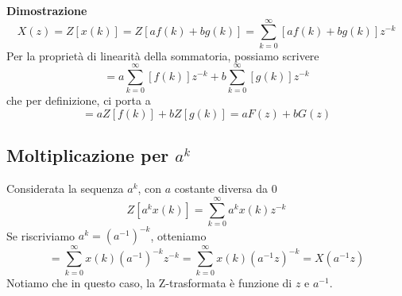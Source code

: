 \documentclass[a4paper]{report}
\newcommand{\bo}{\bfseries }
\begin{document}
  {\bo Dimostrazione}
  \[
  X(z) = Z[x(k)] = Z[af(k) + bg(k)] = \sum_{k=0}^{\infty} [af(k) + bg(k)]z^{-k}
  \]
  Per la propriet\`a di linearit\`a della sommatoria, possiamo
  scrivere
  \[
  = a\sum_{k=0}^{\infty} [f(k)]z^{-k} + b\sum_{k=0}^{\infty} [g(k)]z^{-k}
  \]
  che per definizione, ci porta a
  \[
  = aZ[f(k)] + bZ[g(k)] = aF(z) + bG(z)
  \]
\subsection{Moltiplicazione per $a^k$}
Considerata la sequenza $a^k$, con $a$ costante diversa da $0$
\[
Z[a^k x(k)] = \sum\limits_{k = 0}^{\infty} a^k x(k) z^{-k}
\]
Se riscriviamo $a^k = (a^{-1})^{-k}$, otteniamo
\[
= \sum\limits_{k=0}^{\infty} x(k)(a^{-1})^{-k}z^{-k}
= \sum\limits_{k=0}^{\infty} x(k)(a^{-1}z)^{-k} = X(a^{-1} z)
\]
Notiamo che in questo caso, la Z-trasformata \`e funzione di $z$ e
$a^{-1}$.
\end{document}
